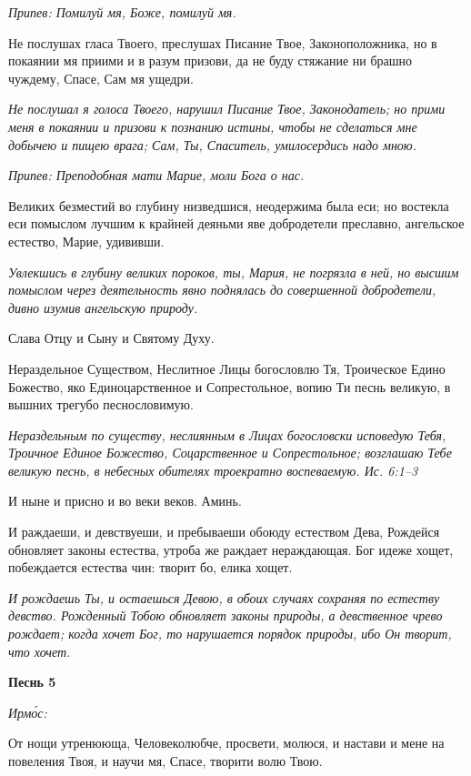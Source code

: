 \itshape Припев:\normalfont{} Помилуй мя, Боже, помилуй мя.


Не послушах гласа Твоего, преслушах Писание Твое, Законоположника, но в покаянии мя приими и в разум призови, да не буду стяжание ни брашно чуждему, Спасе, Сам мя ущедри.


\itshape Не послушал я голоса Твоего, нарушил Писание Твое, Законодатель; но прими меня в покаянии и призови к познанию истины, чтобы не сделаться мне добычею и пищею врага; Сам, Ты, Спаситель, умилосердись надо мною.\normalfont{}


\itshape Припев:\normalfont{} Преподобная мати Марие, моли Бога о нас.


Великих безместий во глубину низведшися, неодержима была еси; но востекла еси помыслом лучшим к крайней деяньми яве добродетели преславно, ангельское естество, Марие, удививши.


\itshape Увлекшись в глубину великих пороков, ты, Мария, не погрязла в ней, но высшим помыслом через деятельность явно поднялась до совершенной добродетели, дивно изумив ангельскую природу.\normalfont{}


Слава Отцу и Сыну и Святому Духу.


Нераздельное Существом, Неслитное Лицы богословлю Тя, Троическое Едино Божество, яко Единоцарственное и Сопрестольное, вопию Ти песнь великую, в вышних трегубо песнословимую.


\itshape Нераздельным по существу, неслиянным в Лицах богословски исповедую Тебя, Троичное Единое Божество, Соцарственное и Сопрестольное; возглашаю Тебе великую песнь, в небесных обителях троекратно воспеваемую. Ис. 6:1–3\normalfont{}


И ныне и присно и во веки веков. Аминь.


И раждаеши, и девствуеши, и пребываеши обоюду естеством Дева, Рождейся обновляет законы естества, утроба же раждает нераждающая. Бог идеже хощет, побеждается естества чин: творит бо, елика хощет.


\itshape И рождаешь Ты, и остаешься Девою, в обоих случаях сохраняя по естеству девство. Рожденный Тобою обновляет законы природы, а девственное чрево рождает; когда хочет Бог, то нарушается порядок природы, ибо Он творит, что хочет.\normalfont{}





\bfseries Песнь 5\normalfont{}


\itshape Ирмо́с:\normalfont{}


От нощи утренююща, Человеколюбче, просвети, молюся, и настави и мене на повеления Твоя, и научи мя, Спасе, творити волю Твою.


